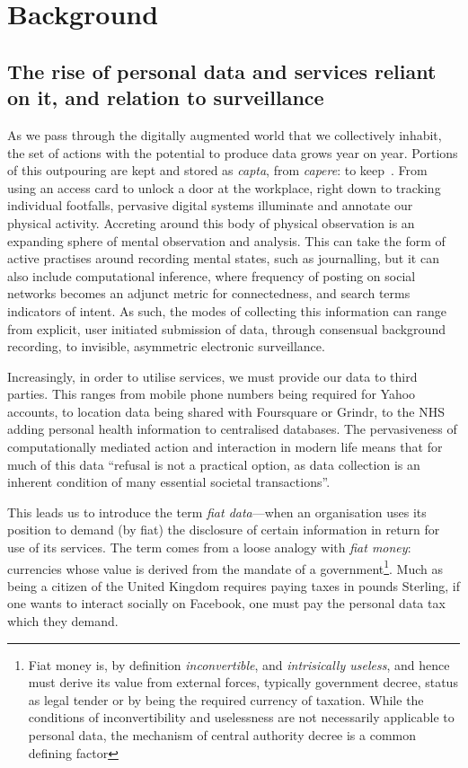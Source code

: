 \documentclass{IOS-Book-Article}     %
\begin{document}
\section{Background}

\subsection{The rise of personal data and services reliant on it, and relation
to surveillance}

As we pass through the digitally augmented world that we collectively inhabit,
the set of actions with the potential to produce data grows year on year.
Portions of this outpouring are kept and stored as
\emph{capta}, from \emph{capere}: to keep~\cite{dodge2005codes}. From
using an access card to unlock a door at the workplace, right down to tracking
individual footfalls, pervasive digital systems illuminate and annotate our
physical activity. Accreting around this body of physical observation is an
expanding sphere of mental observation and analysis. This can take the form of
active practises around recording mental states, such as journalling, but it can
also include computational inference, where frequency of posting on social
networks becomes an adjunct metric for connectedness, and search terms 
indicators of intent. As such, the modes of collecting this information can
range from explicit, user initiated submission of data, through consensual
background recording, to invisible, asymmetric electronic surveillance.

Increasingly, in order to utilise services, we must provide our data to third
parties. This ranges from mobile phone numbers being required for Yahoo
accounts, to location data being shared with Foursquare or Grindr, to the NHS
adding personal health information to centralised databases. 
The pervasiveness of computationally mediated action and interaction in modern
life means that for much of this data ``refusal is not a practical option, as
data collection is an inherent condition of many essential societal
transactions''\cite{brunton2011vernacular}. 

This leads us to introduce the term 
\emph{fiat data}---when an
organisation uses its position to demand (by fiat) the disclosure of certain
information in return for use of its services. The term comes from a loose
analogy with \emph{fiat money}: currencies whose value is derived from the
mandate of a government\footnote{Fiat money is, by definition
\emph{inconvertible}, and \emph{intrisically useless}, and hence must derive
its value from external forces, typically government decree, status as legal
tender or by being the required currency of taxation. While the conditions of
inconvertibility and uselessness are not necessarily applicable to personal
data, the mechanism of central authority decree is a common defining factor}. 
Much as being a citizen of the United Kingdom requires paying taxes in pounds
Sterling, if one wants to interact socially on Facebook, one must pay the
personal data tax which they demand. 
\end{document}
